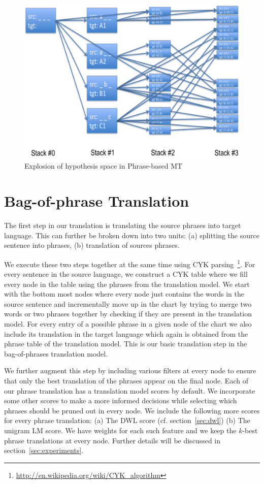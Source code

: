 \documentclass[11pt]{article}
\numberwithin{equation}{section}
\begin{document}
\begin{figure}[t]
  \centering
  \includegraphics[width=1.5\columnwidth]{hyp-explosion.png}
  \caption{Explosion of hypothesis space in Phrase-based MT}
  \label{fig:exp-hyp}
\end{figure}

\section{Bag-of-phrase Translation}
\label{sec:bof}

The first step in our translation is translating the source phrases into target language.
This can further be broken down into two units: (a) splitting the source sentence into phrases,
(b) translation of sources phrases.

We execute these two steps together at the same time using CYK parsing~\footnote{\url{http://en.wikipedia.org/wiki/CYK_algorithm}}.
For every sentence in the source language, we construct a CYK table where we fill every node in the table using the phrases
from the translation model. We start with the bottom most nodes where every node just contains the words in the source sentence
and incrementally move up in the chart by trying to merge two words or two phrases together by checking if they are present in the
translation model. For every entry of a possible phrase in a given node of the chart we also include its translation in the 
target language which again is obtained from the phrase table of the translation model. This is our basic translation step in the 
bag-of-phrases translation model.

We further augment this step by including various filters at every node to ensure that only the best translation of the phrases appear
on the final node. Each of our phrase translation has a translation model scores by default. We incorporate some other scores
to make a more informed decisions while selecting which phrases should be pruned out in every node. We include the following more
scores for every phrase translation: (a) The DWL score (cf. section~\ref{sec:dwl}) (b) The unigram LM score. We have weights for each 
such feature and we keep the $k$-best phrase translations at every node. Further details will be discussed in 
section~\ref{sec:experiments}.
\end{document}
